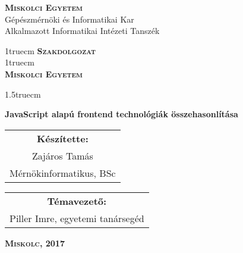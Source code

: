 \pagestyle{empty} %

\begin{flushleft}
\textsc{\bfseries Miskolci Egyetem}\\
Gépészmérnöki és Informatikai Kar\\
Alkalmazott Informatikai Intézeti Tanszék
\end{flushleft}

{\large
\begin{center}
\vglue 1truecm
\textbf{\huge\textsc{Szakdolgozat}}\\
\vglue 1truecm
\\
\textbf{\textsc{Miskolci Egyetem}}
\end{center}}

\vglue 1.5truecm %

{\LARGE
\begin{center}
\textbf{JavaScript alapú frontend technológiák összehasonlítása}
\end{center}}

\vspace*{2.5truecm}
{\large
\begin{center}
\begin{tabular}{c}
\textbf{Készítette:}\\
Zajáros Tamás\\
Mérnökinformatikus, BSc
\end{tabular}
\end{center}
\begin{center}
\begin{tabular}{c}
\textbf{Témavezető:}\\
Piller Imre, egyetemi tanársegéd
\end{tabular}
\end{center}}
\vfill
{\large
\begin{center}
\textbf{\textsc{Miskolc, 2017}}
\end{center}}

\newpage
